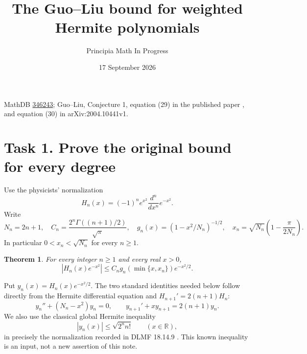 \documentclass[11pt]{article}
\title{The Guo--Liu bound for weighted Hermite polynomials}
\author{Principia Math In Progress}
\date{17 September 2026}
\newtheorem{theorem}{Theorem}
\begin{document}
\maketitle
\noindent MathDB \href{https://mathdb.com/p/346243}{346243};
Guo--Liu, Conjecture 1, equation (29) in the published paper
\cite{GL}, and equation (30) in arXiv:2004.10441v1.

\section*{Task 1. Prove the original bound for every degree}
Use the physicists' normalization
\[
 H_n(x)=(-1)^ne^{x^2}\frac{d^n}{dx^n}e^{-x^2}.
\]
Write
\[
 N_n=2n+1,\quad C_n=\frac{2^n\Gamma((n+1)/2)}{\sqrt\pi},\quad
 g_n(x)=(1-x^2/N_n)^{-1/2},\quad
 x_n=\sqrt{N_n}\left(1-\frac{\pi}{2N_n}\right).
\]
In particular $0<x_n<\sqrt{N_n}$ for every $n\ge1$.

\begin{theorem}\label{thm:main}
For every integer $n\ge1$ and every real $x>0$,
\begin{equation}\label{eq:target}
 |H_n(x)e^{-x^2}|
 \le C_n g_n(\min\{x,x_n\})e^{-x^2/2}.
\end{equation}
\end{theorem}

Put $y_n(x)=H_n(x)e^{-x^2/2}$. The two standard identities needed below
follow directly from the Hermite differential equation and
$H_{n+1}'=2(n+1)H_n$:
\begin{equation}\label{eq:ode}
 y_n''+(N_n-x^2)y_n=0,\qquad
 y_{n+1}'+xy_{n+1}=2(n+1)y_n.
\end{equation}
We also use the classical global Hermite inequality
\begin{equation}\label{eq:global}
 |y_n(x)|\le\sqrt{2^n n!}\qquad(x\in\mathbb R),
\end{equation}
in precisely the normalization recorded in DLMF 18.14.9 \cite{DLMF}.
This known inequality is an input, not a new assertion of this note.
\end{document}
